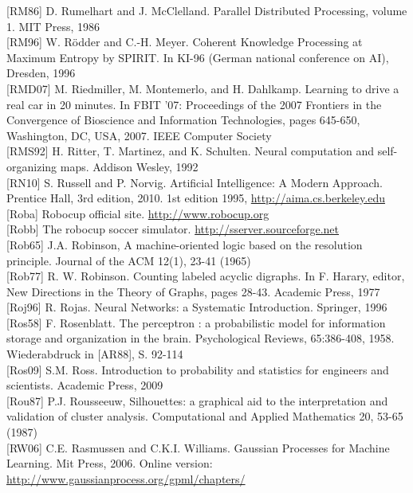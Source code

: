 \documentclass[10pt]{article}
\begin{document}
[RM86] D. Rumelhart and J. McClelland. Parallel Distributed Processing, volume 1. MIT Press, 1986\\[0pt]
[RM96] W. Rödder and C.-H. Meyer. Coherent Knowledge Processing at Maximum Entropy by SPIRIT. In KI-96 (German national conference on AI), Dresden, 1996\\[0pt]
[RMD07] M. Riedmiller, M. Montemerlo, and H. Dahlkamp. Learning to drive a real car in 20 minutes. In FBIT '07: Proceedings of the 2007 Frontiers in the Convergence of Bioscience and Information Technologies, pages 645-650, Washington, DC, USA, 2007. IEEE Computer Society\\[0pt]
[RMS92] H. Ritter, T. Martinez, and K. Schulten. Neural computation and self-organizing maps. Addison Wesley, 1992\\[0pt]
[RN10] S. Russell and P. Norvig. Artificial Intelligence: A Modern Approach. Prentice Hall, 3rd edition, 2010. 1st edition 1995, \href{http://aima.cs.berkeley.edu}{http://aima.cs.berkeley.edu}\\[0pt]
[Roba] Robocup official site. \href{http://www.robocup.org}{http://www.robocup.org}\\[0pt]
[Robb] The robocup soccer simulator. \href{http://sserver.sourceforge.net}{http://sserver.sourceforge.net}\\[0pt]
[Rob65] J.A. Robinson, A machine-oriented logic based on the resolution principle. Journal of the ACM 12(1), 23-41 (1965)\\[0pt]
[Rob77] R. W. Robinson. Counting labeled acyclic digraphs. In F. Harary, editor, New Directions in the Theory of Graphs, pages 28-43. Academic Press, 1977\\[0pt]
[Roj96] R. Rojas. Neural Networks: a Systematic Introduction. Springer, 1996\\[0pt]
[Ros58] F. Rosenblatt. The perceptron : a probabilistic model for information storage and organization in the brain. Psychological Reviews, 65:386-408, 1958. Wiederabdruck in [AR88], S. 92-114\\[0pt]
[Ros09] S.M. Ross. Introduction to probability and statistics for engineers and scientists. Academic Press, 2009\\[0pt]
[Rou87] P.J. Rousseeuw, Silhouettes: a graphical aid to the interpretation and validation of cluster analysis. Computational and Applied Mathematics 20, 53-65 (1987)\\[0pt]
[RW06] C.E. Rasmussen and C.K.I. Williams. Gaussian Processes for Machine Learning. Mit Press, 2006. Online version: \href{http://www.gaussianprocess.org/gpml/chapters/}{http://www.gaussianprocess.org/gpml/chapters/}\\[0pt]
\end{document}
